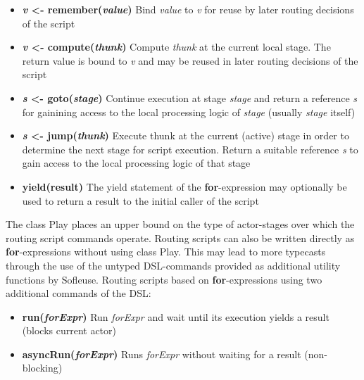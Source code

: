 \documentclass{sig-alternate}
\begin{document}
\begin{itemize}                                   
	\item \textbf{\emph{v} <- remember(\emph{value})} Bind \emph{value} to \emph{v} for reuse by
	later routing decisions of the script
	\item \textbf{\emph{v} <- compute(\emph{thunk})} Compute \emph{thunk} at the current local stage.  
	The return value is bound to \emph{v} and may be reused in later routing decisions of the script
	\item \textbf{\emph{s} <- goto(\emph{stage})} Continue execution at stage \emph{stage} and 
	return a reference \emph{s} for gainining access to the local processing logic of \emph{stage} 
	(usually \emph{stage} itself)
	\item \textbf{\emph{s} <- jump(\emph{thunk})} Execute thunk at the current (active) stage in 
	order to determine the next stage for script execution.	Return a suitable reference \emph{s} to 
	gain access to the local processing logic of that stage
	\item \textbf{yield(result)} The yield statement of the \textbf{for}-expression may optionally be used to 
	return a result to the initial caller of the script                           	
\end{itemize}


The class Play places an upper bound on the type of actor-stages over which the routing script
commands operate. Routing scripts can also be written directly as \textbf{for}-expressions without
using class Play. This may lead to more typecasts through the use of the untyped DSL-commands
provided as additional utility functions by Sofleuse. Routing scripts based on
\textbf{for}-expressions using two additional commands of the DSL:

\begin{itemize}
    \item \textbf{run(\emph{forExpr})} Run \emph{forExpr} and wait until its execution yields a result (blocks current actor)
	\item \textbf{asyncRun(\emph{forExpr})} Runs \emph{forExpr} without waiting for a result (non-blocking)
\end{itemize}	
\end{document}

